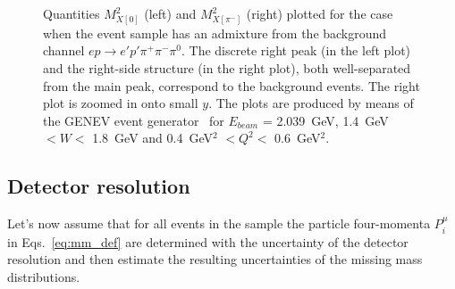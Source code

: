 \begin{figure}[htp]
\begin{center}
\caption{\small Quantities $M_{X[0]}^{2}$ (left) and $M_{X[\pi^{-}]}^{2}$ (right) plotted for the case when the event sample has an admixture from the background channel $ep\rightarrow e'p'\pi^{+}\pi^{-}\pi^{0}$. The discrete right peak (in the left plot) and the right-side structure (in the right plot), both well-separated from the main peak, correspond to the background events. The right plot is zoomed in onto small $y$. The plots are produced by means of the GENEV event generator~\cite{Genev} for $E_{beam}$ = 2.039~GeV, 1.4~GeV $< W <$ 1.8~GeV and 0.4~GeV$^{2}$ $< Q^{2} <$ 0.6~GeV$^{2}$.  } \label{fig:mm_backgr}
\end{center}
\end{figure}
\vspace{-1.5em}


\vspace{-0.75em}
\subsection* {Detector resolution}
\vspace{-0.5em}
Let's now assume that for all events in the sample the particle four-momenta $P_{i}^{\mu}$ in Eqs.~\eqref{eq:mm_def} are determined with the uncertainty of the detector resolution and then estimate the resulting uncertainties of the missing mass distributions. 

